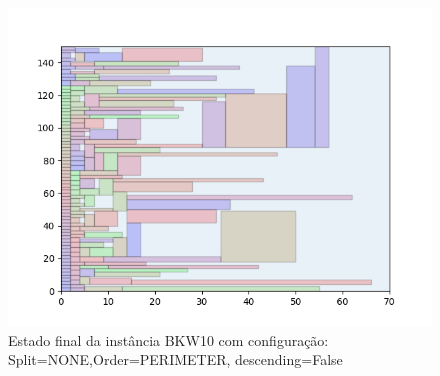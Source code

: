 \begin{figure}[H]
    \centering
    \caption[]{Estado final da instância BKW10 com configuração: Split=NONE,Order=PERIMETER, descending=False}
    \label{fig:bkw10-none-perimeter-false}
    \includegraphics[scale=0.5]{output/figures/bkw/bkw10/none/perimeter/false/000}
\end{figure}
